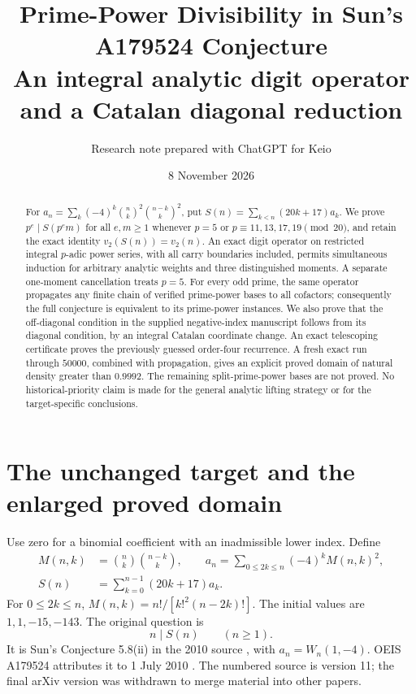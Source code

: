 \documentclass[11pt,a4paper]{article}
\title{\textbf{Prime-Power Divisibility in Sun's\\A179524 Conjecture}\\[5pt]
\large An integral analytic digit operator and a Catalan diagonal reduction}
\author{Research note prepared with ChatGPT for Keio}
\date{8 November 2026}
\theoremstyle{remark}\newtheorem{remark}[theorem]{Remark}
\begin{document}
\maketitle
\begin{abstract}
For \(a_n=\sum_k(-4)^k\binom nk^2\binom{n-k}k^2\), put
\(S(n)=\sum_{k<n}(20k+17)a_k\).
We prove \(p^e\mid S(p^em)\) for all \(e,m\ge1\) whenever
\(p=5\) or \(p\equiv11,13,17,19\pmod{20}\), and retain the exact
identity \(v_2(S(n))=v_2(n)\).
An exact digit operator on restricted integral \(p\)-adic power series,
with all carry boundaries included, permits simultaneous induction
for arbitrary analytic weights and three distinguished moments.
A separate one-moment cancellation treats \(p=5\).
For every odd prime, the same operator propagates any finite chain of
verified prime-power bases to all cofactors; consequently the full
conjecture is equivalent to its prime-power instances.
We also prove that the off-diagonal condition in the supplied
negative-index manuscript follows from its diagonal condition, by an
integral Catalan coordinate change.
An exact telescoping certificate proves the previously guessed
order-four recurrence. A fresh exact run through \(50000\), combined
with propagation, gives an explicit proved domain of natural density
greater than \(0.9992\).
The remaining split-prime-power bases are not proved.
No historical-priority claim is made for the general analytic lifting
strategy or for the target-specific conclusions.
\end{abstract}

\section{The unchanged target and the enlarged proved domain}

Use zero for a binomial coefficient with an inadmissible lower index.
Define
\begin{equation}\label{def}
 \begin{aligned}
 M(n,k)&=\binom nk\binom{n-k}k,\qquad
 a_n=\sum_{0\le2k\le n}(-4)^kM(n,k)^2,\\
 S(n)&=\sum_{k=0}^{n-1}(20k+17)a_k.
 \end{aligned}
\end{equation}
For \(0\le2k\le n\), \(M(n,k)=n!/[k!^2(n-2k)!]\).
The initial values are \(1,1,-15,-143\).
The original question is
\begin{equation}\label{target}
                         n\mid S(n)\qquad(n\ge1).
\end{equation}
It is Sun's Conjecture 5.8(ii) in the 2010 source
\cite[printed p.~33]{Sun2010}, with \(a_n=W_n(1,-4)\).
OEIS A179524 attributes it to 1 July 2010 \cite{OEIS}.
The numbered source is version 11; the final arXiv version was
withdrawn to merge material into other papers.
\end{document}

